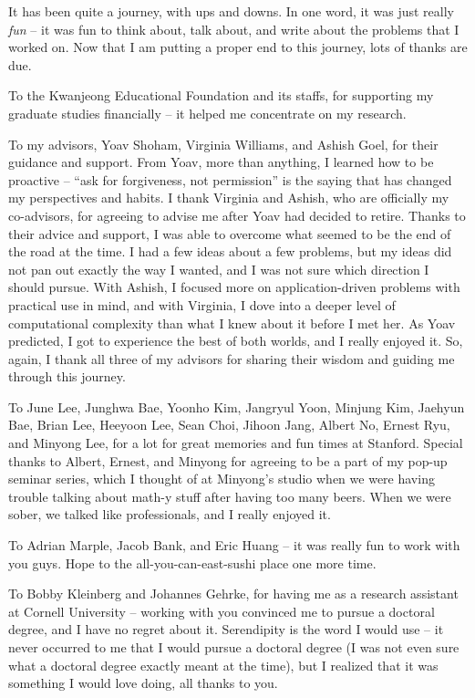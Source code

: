It has been quite a journey, with ups and downs.
In one word, it was just really {\em fun} -- it was fun to think about, talk about, and write about the problems that I worked on. 
Now that I am putting a proper end to this journey, lots of thanks are due. 

To the Kwanjeong Educational Foundation and its staffs, for supporting my graduate studies financially -- it helped me concentrate on my research.

To my advisors, Yoav Shoham, Virginia Williams, and Ashish Goel, for their guidance and support. From Yoav, more than anything, I learned how to be proactive -- ``ask for forgiveness, not permission'' is the saying that has changed my perspectives and habits. I thank Virginia and Ashish, who are officially my co-advisors, for agreeing to advise me after Yoav had decided to retire. Thanks to their advice and support, I was able to overcome what seemed to be the end of the road at the time. I had a few ideas about a few problems, but my ideas did not pan out exactly the way I wanted, and I was not sure which direction I should pursue. With Ashish, I focused more on application-driven problems with practical use in mind, and with Virginia, I dove into a deeper level of computational complexity than what I knew about it before I met her. As Yoav predicted, I got to experience the best of both worlds, and I really enjoyed it. So, again, I thank all three of my advisors for sharing their wisdom and guiding me through this journey.

To June Lee, Junghwa Bae, Yoonho Kim, Jangryul Yoon, Minjung Kim, Jaehyun Bae, Brian Lee, Heeyoon Lee, Sean Choi, Jihoon Jang, Albert No, Ernest Ryu, and Minyong Lee, for a lot for great memories and fun times at Stanford. 
Special thanks to Albert, Ernest, and Minyong for agreeing to be a part of my pop-up seminar series, which I thought of at Minyong's studio when we were having trouble talking about math-y stuff after having too many beers. When we were sober, we talked like professionals, and I really enjoyed it. 

To Adrian Marple, Jacob Bank, and Eric Huang -- it was really fun to work with you guys. Hope to the all-you-can-east-sushi place one more time.


To Bobby Kleinberg and Johannes Gehrke, for having me as a research assistant at Cornell University -- working with you convinced me to pursue a doctoral degree, and I have no regret about it. Serendipity is the word I would use -- it never occurred to me that I would pursue a doctoral degree (I was not even sure what a doctoral degree exactly meant at the time), but I realized that it was something I would love doing, all thanks to you. 

